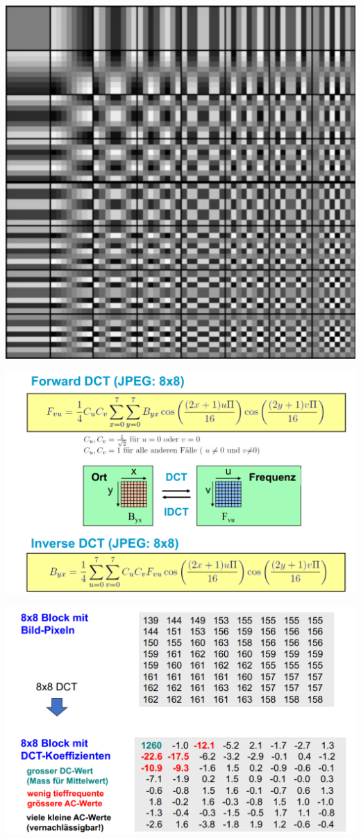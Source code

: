 \begin{center}
    \includegraphics[width=0.6\linewidth]{images/dct.png}
\end{center}

\begin{center}
    \includegraphics[width=1\linewidth]{images/dctfunction.png}
\end{center}

\begin{center}
    \includegraphics[width=1\linewidth]{images/dctblock.png}
\end{center}

